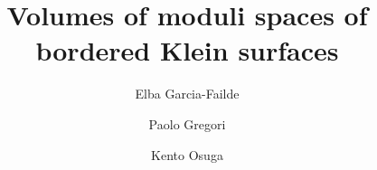 \documentclass[12pt]{amsart}
\theoremstyle{plain}
\theoremstyle{definition}
\theoremstyle{remark}
\numberwithin{equation}{section}
\begin{document}
	
\title{Volumes of moduli spaces of bordered Klein surfaces}

\author[E.~Garcia-Failde]{Elba Garcia-Failde}
\address[E.~G.]{Institut de Math\'ematiques de Jussieu - Paris Rive Gauche \\ Sorbonne Universit\'e, Paris, France.}

\address[E.~G.]{Departament de Matem\`{a}tiques  \\ Universitat Polit\`{e}cnica de Catalunya, Barcelona, Spain.}

\author[P.~Gregori]{Paolo Gregori}
\address[P.~G.]{Universit\'e Paris-Saclay, CNRS, CEA, Institut de Physique Th\'eorique, Gif-sur-Yvette, France.}


\author[K.~Osuga]{Kento Osuga}
\address[K.~O.]{Graduate School of Mathematical Sciences, University of Tokyo, Tokyo, Japan.}
\address[K.~O.]{Kobayashi--Masakawa Institute for the Origin of Particles and the Universe}
\address[K.~O.]{Graduate School of Mathematics, Nagoya University, Nagoya, Japan.}
\end{document}

